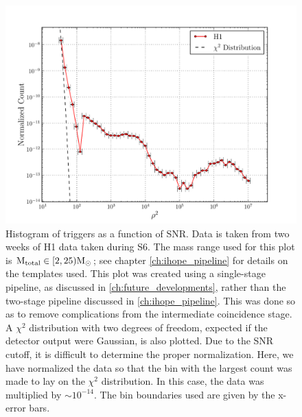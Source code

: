 \begin{figure}
\label{fig:snr_hist}
\begin{center}
\includegraphics[width=6in]{figures/H1-snr_hist_cat1_veto.pdf}
\end{center}
\caption{Histogram of triggers as a function of \ac{SNR}. Data is taken from two weeks of H1 data taken during \ac{S6}. The mass range used for this plot is $\mathrm{M_{total}} \in [2,25)\mathrm{M_\odot}$; see chapter \ref{ch:ihope_pipeline} for details on the templates used. This plot was created using a single-stage pipeline, as discussed in \ref{ch:future_developments}, rather than the two-stage pipeline discussed in \ref{ch:ihope_pipeline}. This was done so as to remove complications from the intermediate coincidence stage. A $\chi^2$ distribution with two degrees of freedom, expected if the detector output were Gaussian, is also plotted. Due to the \ac{SNR} cutoff, it is difficult to determine the proper normalization. Here, we have normalized the data so that the bin with the largest count was made to lay on the $\chi^2$ distribution. In this case, the data was multiplied by $\sim10^{-14}$. The bin boundaries used are given by the x-error bars.}
\end{figure}

